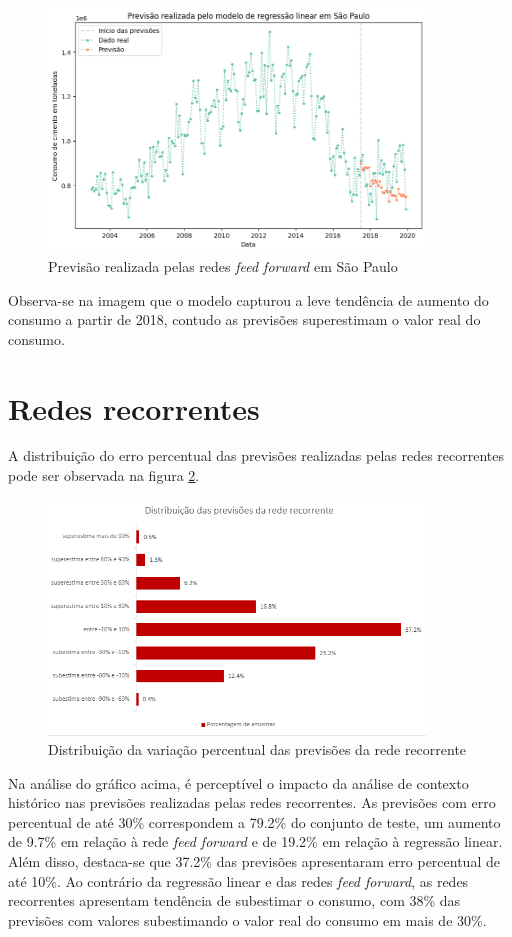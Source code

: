 \begin{figure}[H]
    \centering
    \includegraphics[width=10cm]{../figuras/graficos/mlp/prev_sp.png}
    \caption{Previsão realizada pelas redes \textit{feed forward} em São Paulo}
    \label{img:consumo-sp-rff}
\end{figure}

Observa-se na imagem que o modelo capturou a leve tendência de aumento do 
consumo a partir de 2018, contudo as previsões superestimam o valor real 
do consumo.

\section{Redes recorrentes}

A distribuição do erro percentual das previsões realizadas pelas redes 
recorrentes pode ser observada na figura \ref{img:erro-perc-rnn}.

\begin{figure}[H]
    \centering
    \includegraphics[width=10cm]{../figuras/graficos/rnn/erro-perc-rnn.png}
    \caption{Distribuição da variação percentual das previsões da rede recorrente}
    \label{img:erro-perc-rnn}
\end{figure}

Na análise do gráfico acima, é perceptível o impacto da análise de contexto histórico 
nas previsões realizadas pelas redes recorrentes. As previsões com erro percentual 
de até 30\% correspondem a 79.2\% do conjunto de teste, um aumento de 9.7\% em 
relação à rede \textit{feed forward} e de 19.2\% em relação à regressão linear.
Além disso, destaca-se que 37.2\% das previsões apresentaram erro percentual 
de até 10\%. Ao contrário da regressão linear e das redes \textit{feed forward},
as redes recorrentes apresentam tendência de subestimar o consumo, com 38\% das
previsões com valores subestimando o valor real do consumo em mais de 30\%.

